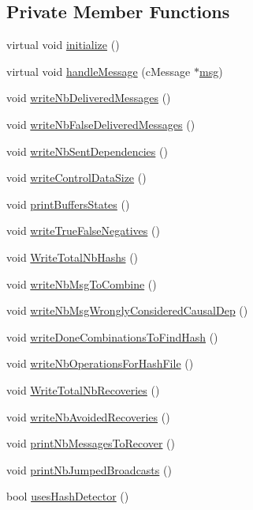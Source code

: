 \subsection*{Private Member Functions}
\begin{DoxyCompactItemize}
\item 
virtual void \hyperlink{classStats_a650afe7cc5721ec17cfdc94475365f89}{initialize} ()
\item 
virtual void \hyperlink{classStats_adaf8eb884008cdcb1f8a08df41566d16}{handle\+Message} (c\+Message $\ast$\hyperlink{Controller_8h_afa0f3b802fbc219228f7bb97996fa558}{msg})
\item 
void \hyperlink{classStats_afff16579776ca8a5e5dbc4483689c2e4}{write\+Nb\+Delivered\+Messages} ()
\item 
void \hyperlink{classStats_a45fda4fde87dda93eaa44357d077d48c}{write\+Nb\+False\+Delivered\+Messages} ()
\item 
void \hyperlink{classStats_a5e7dc3debec2bdc35b11e713283ab0b3}{write\+Nb\+Sent\+Dependencies} ()
\item 
void \hyperlink{classStats_a49086baebc806841600c8545b5315149}{write\+Control\+Data\+Size} ()
\item 
void \hyperlink{classStats_a890d6dea5350042fd71313826b103583}{print\+Buffers\+States} ()
\item 
void \hyperlink{classStats_aa76e3bfd22087fad066c5a628a269d06}{write\+True\+False\+Negatives} ()
\item 
void \hyperlink{classStats_a89cedfe36937b0f9a5f525a8858e54f2}{Write\+Total\+Nb\+Hashs} ()
\item 
void \hyperlink{classStats_ae91ab66504445b9e703966b505a55eaa}{write\+Nb\+Msg\+To\+Combine} ()
\item 
void \hyperlink{classStats_a04ae8a18f5e0713f9275a3cf7b20d181}{write\+Nb\+Msg\+Wrongly\+Considered\+Causal\+Dep} ()
\item 
void \hyperlink{classStats_a73a83aa6b190ceb71e8ed2b131338d81}{write\+Done\+Combinations\+To\+Find\+Hash} ()
\item 
void \hyperlink{classStats_af07c3564deda3a19d1efe92108a20c19}{write\+Nb\+Operations\+For\+Hash\+File} ()
\item 
void \hyperlink{classStats_a75689d1481b0605ce74d775e36c21740}{Write\+Total\+Nb\+Recoveries} ()
\item 
void \hyperlink{classStats_ac6a0fdf44cc2a3dc11ff22eb75faacf2}{write\+Nb\+Avoided\+Recoveries} ()
\item 
void \hyperlink{classStats_ae2c59851f26885a62c2e65fda16d47ee}{print\+Nb\+Messages\+To\+Recover} ()
\item 
void \hyperlink{classStats_aaba10264a569b9240a300ddc341e6a8c}{print\+Nb\+Jumped\+Broadcasts} ()
\item 
bool \hyperlink{classStats_a509d8e8fba4312eeffe2c6cee722f30f}{uses\+Hash\+Detector} ()
\end{DoxyCompactItemize}
